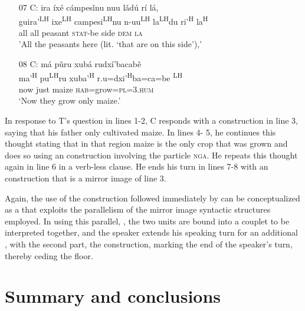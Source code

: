 \begin{itemize}
\item[07 C:] 
\glll ira \'{i}x\'{e} c\'{a}mpes\v{i}nu nuu l\v{a}d\'{u} r\'{i} l\'{a}, \\
guira'\textsuperscript{LH} ixe\textsuperscript{LH} campesi\textsuperscript{LH}nu n-uu\textsuperscript{LH} la\textsuperscript{LH}du ri'\textsuperscript{H}  la\textsuperscript{H} \\
all all peasant \textsc{stat}-be side \textsc{dem} \textsc{la} \\
\glt 'All the peasants here (lit. `that are on this side'),'


\item[08 C:]
\glll m\'{a} p\v{u}ru xub\'{a} rudx\'{i}'bacab\v{e}  \\        
ma'\textsuperscript{H} pu\textsuperscript{LH}ru xuba'\textsuperscript{H} r.u=dxi'\textsuperscript{H}ba=ca=be \textsuperscript{LH}  \\
now just maize \textsc{hab}=grow=\textsc{pl=3.hum}  \\
\glt `Now they grow only maize.' 

\end{itemize}
\z

In response to T's question in lines 1-2, C responds with a  construction in line 3, saying that his father only cultivated maize. In lines 4- 5, he continues this thought stating that in that region maize is the only crop that was grown and does so using an  construction involving the particle \textsc{nga}. He repeats this thought again in line 6 in a verb-less clause. He ends his turn in lines 7-8 with an  construction that is a mirror image of line 3. 

Again, the use of the  construction followed immediately by  can be conceptualized as a  that exploits the parallelism of the mirror image syntactic structures employed. In using this parallel, , the two  units are bound into a couplet to be interpreted together, and the speaker extends his speaking turn for an additional , with the second part, the  construction, marking the end of the speaker's turn, thereby ceding the floor.


\section{Summary and conclusions}


